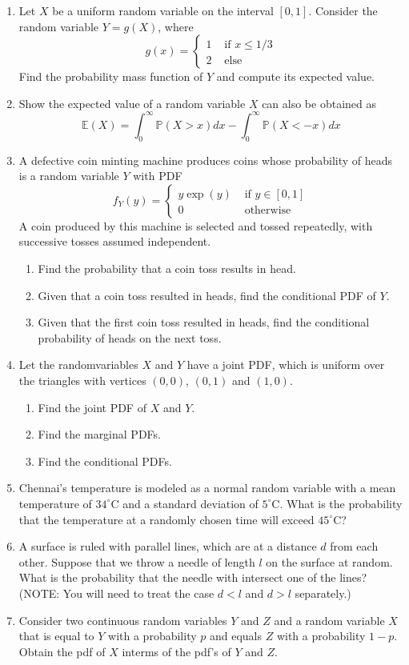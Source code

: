 \documentclass{article}
\newcommand{\dint}{\displaystyle\int}
\newcommand{\Pb}{\mathbb{P}}
\newcommand{\Eb}{\mathbb{E}}
\newcommand{\bkt}[1]{\left(#1\right)}
\begin{document}
\begin{enumerate}
		\item
		Let $X$ be a uniform random variable on the interval $[0,1]$. Consider the random variable $Y=g\bkt{X}$, where
		$$g(x) = \begin{cases}
		1 & \text{ if }x \leq 1/3\\
		2 & \text{ else}
		\end{cases}$$
		Find the probability mass function of $Y$ and compute its expected value.
		\item
		Show the expected value of a random variable $X$ can also be obtained as
		$$\Eb\bkt{X} = \dint_0^{\infty} \Pb \bkt{X > x}dx - \dint_0^{\infty} \Pb\bkt{X < -x}dx$$
		\item
		A defective coin minting machine produces coins whose probability of heads is a random variable $Y$ with PDF
		$$f_Y\bkt{y} = \begin{cases}
		y \exp\bkt{y} & \text{ if }y \in [0,1]\\
		0 & \text{ otherwise}
		\end{cases}$$
		A coin produced by this machine is selected and tossed repeatedly, with successive tosses assumed independent.
		\begin{enumerate}
			\item
			Find the probability that a coin toss results in head.
			\item
			Given that a coin toss resulted in heads, find the conditional PDF of $Y$.
			\item
			Given that the first coin toss resulted in heads, find the conditional probability of heads on the next toss.
		\end{enumerate}
		\item
		Let the randomvariables $X$ and $Y$ have a joint PDF, which is uniform over the triangles with vertices $(0,0)$, $(0,1)$ and $(1,0)$.
		\begin{enumerate}
			\item
			Find the joint PDF of $X$ and $Y$.
			\item
			Find the marginal PDFs.
			\item
			Find the conditional PDFs.
		\end{enumerate}
		\item
		Chennai's temperature is modeled as a normal random variable with a mean temperature of $34^{\circ}$C and a standard deviation of $5^{\circ}$C. What is the probability that the temperature at a randomly chosen time will exceed $45^{\circ}$C?
		\item
		A surface is ruled with parallel lines, which are at a distance $d$ from each other. Suppose that we throw a needle of length $l$ on the surface at random. What is the probability that the needle with intersect one of the lines? (NOTE: You will need to treat the case $d<l$ and $d>l$ separately.)
		\item
		Consider two continuous random variables $Y$ and $Z$ and a random variable $X$ that is equal to $Y$ with a probability $p$ and equals $Z$ with a probability $1-p$. Obtain the pdf of $X$ interms of the pdf's of $Y$ and $Z$.
	\end{enumerate}
\end{document}

